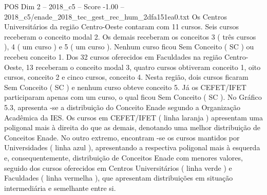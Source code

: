 \begin{textsample}{POS Dim 2 – 2018\_c5 – Score -1.00 – 2018\_c5/enade\_2018\_tec\_gest\_rec\_hum\_2dfa151ea0.txt}
Os Centros Universitários da região Centro-Oeste contaram com 11 cursos.
Seis cursos receberam o conceito modal 2.
Os demais receberam os conceitos 3 ( três cursos ), 4 ( um curso ) e 5 ( um curso ).
Nenhum curso ficou Sem Conceito ( SC ) ou recebeu conceito 1.
Dos 32 cursos oferecidos em Faculdades na região Centro-Oeste, 13 receberam o conceito modal 3, quatro cursos obtiveram conceito 1, oito cursos, conceito 2 e cinco cursos, conceito 4.
Nesta região, dois cursos ficaram Sem Conceito ( SC ) e nenhum curso obteve conceito 5.
Já os CEFET/IFET participaram apenas com um curso, o qual ficou Sem Conceito ( SC ).
No Gráfico 5.3, apresenta -se a distribuição do Conceito Enade segundo a Organização Acadêmica da IES.
Os cursos em CEFET/IFET ( linha laranja ) apresentam uma poligonal mais à direita do que as demais, denotando uma melhor distribuição de Conceitos Enade.
No outro extremo, encontram -se os cursos mantidos por Universidades ( linha azul ), apresentando a respectiva poligonal mais à esquerda e, consequentemente, distribuição de Conceitos Enade com menores valores, seguido dos cursos oferecidos em Centros Universitários ( linha verde ) e Faculdades ( linha vermelha ), que apresentam distribuições em situação intermediária e semelhante entre si.

\end{textsample}
